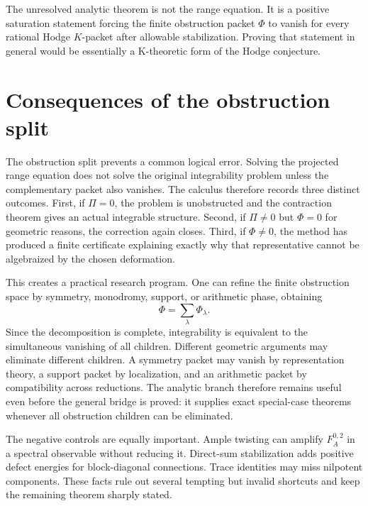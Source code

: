 \begin{openproblem}
The unresolved analytic theorem is not the range equation. It is a positive saturation statement forcing the finite obstruction packet $\Phi$ to vanish for every rational Hodge $K$-packet after allowable stabilization. Proving that statement in general would be essentially a K-theoretic form of the Hodge conjecture.
\end{openproblem}

\section{Consequences of the obstruction split}
The obstruction split prevents a common logical error. Solving the projected range equation does not solve the original integrability problem unless the complementary packet also vanishes. The calculus therefore records three distinct outcomes. First, if $\Pi=0$, the problem is unobstructed and the contraction theorem gives an actual integrable structure. Second, if $\Pi\ne0$ but $\Phi=0$ for geometric reasons, the correction again closes. Third, if $\Phi\ne0$, the method has produced a finite certificate explaining exactly why that representative cannot be algebraized by the chosen deformation.

This creates a practical research program. One can refine the finite obstruction space by symmetry, monodromy, support, or arithmetic phase, obtaining
\[
\Phi=\sum_{\lambda}\Phi_{\lambda}.
\]
Since the decomposition is complete, integrability is equivalent to the simultaneous vanishing of all children. Different geometric arguments may eliminate different children. A symmetry packet may vanish by representation theory, a support packet by localization, and an arithmetic packet by compatibility across reductions. The analytic branch therefore remains useful even before the general bridge is proved: it supplies exact special-case theorems whenever all obstruction children can be eliminated.

The negative controls are equally important. Ample twisting can amplify $F_A^{0,2}$ in a spectral observable without reducing it. Direct-sum stabilization adds positive defect energies for block-diagonal connections. Trace identities may miss nilpotent components. These facts rule out several tempting but invalid shortcuts and keep the remaining theorem sharply stated.



